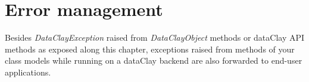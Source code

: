 
%
%
%
%
%
%
%
% 
%

\section {Error management}
\label{sec:PythonErrorHandling}

Besides \textit{DataClayException} raised from \textit{DataClayObject} methods or dataClay API methods as exposed along this chapter, exceptions raised from methods of your class models while running on a dataClay backend are also forwarded to end-user applications.

